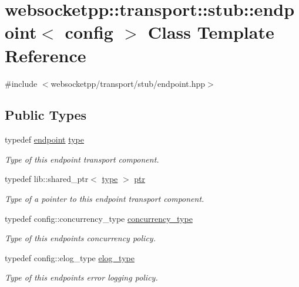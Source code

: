 \hypertarget{classwebsocketpp_1_1transport_1_1stub_1_1endpoint}{}\section{websocketpp\+:\+:transport\+:\+:stub\+:\+:endpoint$<$ config $>$ Class Template Reference}
\label{classwebsocketpp_1_1transport_1_1stub_1_1endpoint}


{\ttfamily \#include $<$websocketpp/transport/stub/endpoint.\+hpp$>$}

\subsection*{Public Types}
\begin{DoxyCompactItemize}
\item 
typedef \hyperlink{classwebsocketpp_1_1transport_1_1stub_1_1endpoint}{endpoint} \hyperlink{classwebsocketpp_1_1transport_1_1stub_1_1endpoint_af621f6f1f67f9e3eea1e0d28eb5f60ae}{type}
\begin{DoxyCompactList}\small\item\em Type of this endpoint transport component. \end{DoxyCompactList}\item 
typedef lib\+::shared\+\_\+ptr$<$ \hyperlink{classwebsocketpp_1_1transport_1_1stub_1_1endpoint_af621f6f1f67f9e3eea1e0d28eb5f60ae}{type} $>$ \hyperlink{classwebsocketpp_1_1transport_1_1stub_1_1endpoint_a00a3092b0664dac9cff00785f2b96e88}{ptr}
\begin{DoxyCompactList}\small\item\em Type of a pointer to this endpoint transport component. \end{DoxyCompactList}\item 
typedef config\+::concurrency\+\_\+type \hyperlink{classwebsocketpp_1_1transport_1_1stub_1_1endpoint_a1d70a45c1abdc4c84867a94511da067e}{concurrency\+\_\+type}
\begin{DoxyCompactList}\small\item\em Type of this endpoint\textquotesingle{}s concurrency policy. \end{DoxyCompactList}\item 
typedef config\+::elog\+\_\+type \hyperlink{classwebsocketpp_1_1transport_1_1stub_1_1endpoint_a7890584ddff40571589f62c52bc5b080}{elog\+\_\+type}
\begin{DoxyCompactList}\small\item\em Type of this endpoint\textquotesingle{}s error logging policy. \end{DoxyCompactList}\item 

\end{DoxyCompactItemize}
